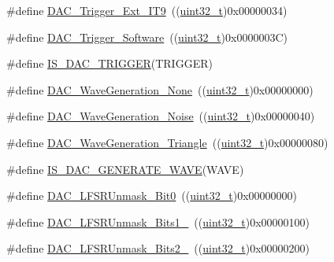 \begin{DoxyCompactItemize}
\item 
\#define \hyperlink{group___d_a_c__trigger__selection_ga67c15b2c26246a2304f9db28e25adcc4}{D\+A\+C\+\_\+\+Trigger\+\_\+\+Ext\+\_\+\+I\+T9}~((\hyperlink{_p_e___types_8h_a33594304e786b158f3fb30289278f5af}{uint32\+\_\+t})0x00000034)
\item 
\#define \hyperlink{group___d_a_c__trigger__selection_gadef77bb8bbd109232900902402ef637f}{D\+A\+C\+\_\+\+Trigger\+\_\+\+Software}~((\hyperlink{_p_e___types_8h_a33594304e786b158f3fb30289278f5af}{uint32\+\_\+t})0x0000003\+C)
\item 
\#define \hyperlink{group___d_a_c__trigger__selection_ga4409b79639e6ae3b1f0ed61a33c810a3}{I\+S\+\_\+\+D\+A\+C\+\_\+\+T\+R\+I\+G\+G\+ER}(T\+R\+I\+G\+G\+ER)
\item 
\#define \hyperlink{group___d_a_c__wave__generation_gaabbcd575d6106267f6b65ce988158f29}{D\+A\+C\+\_\+\+Wave\+Generation\+\_\+\+None}~((\hyperlink{_p_e___types_8h_a33594304e786b158f3fb30289278f5af}{uint32\+\_\+t})0x00000000)
\item 
\#define \hyperlink{group___d_a_c__wave__generation_ga1692990325098cae6f32182c1fa0f61e}{D\+A\+C\+\_\+\+Wave\+Generation\+\_\+\+Noise}~((\hyperlink{_p_e___types_8h_a33594304e786b158f3fb30289278f5af}{uint32\+\_\+t})0x00000040)
\item 
\#define \hyperlink{group___d_a_c__wave__generation_ga68f1a71011437a5ea6298ab039554714}{D\+A\+C\+\_\+\+Wave\+Generation\+\_\+\+Triangle}~((\hyperlink{_p_e___types_8h_a33594304e786b158f3fb30289278f5af}{uint32\+\_\+t})0x00000080)
\item 
\#define \hyperlink{group___d_a_c__wave__generation_ga50fb2dd12305cd7bd0b738a1f6388d3c}{I\+S\+\_\+\+D\+A\+C\+\_\+\+G\+E\+N\+E\+R\+A\+T\+E\+\_\+\+W\+A\+VE}(W\+A\+VE)
\item 
\#define \hyperlink{group___d_a_c__lfsrunmask__triangleamplitude_ga60794fd5092a332cfa82e1cee13945fc}{D\+A\+C\+\_\+\+L\+F\+S\+R\+Unmask\+\_\+\+Bit0}~((\hyperlink{_p_e___types_8h_a33594304e786b158f3fb30289278f5af}{uint32\+\_\+t})0x00000000)
\item 
\#define \hyperlink{group___d_a_c__lfsrunmask__triangleamplitude_ga09f47cfa563252a1add4662284350c07}{D\+A\+C\+\_\+\+L\+F\+S\+R\+Unmask\+\_\+\+Bits1\+\_}~((\hyperlink{_p_e___types_8h_a33594304e786b158f3fb30289278f5af}{uint32\+\_\+t})0x00000100)
\item 
\#define \hyperlink{group___d_a_c__lfsrunmask__triangleamplitude_ga60b800857b7e33d9c0be2846fc56849f}{D\+A\+C\+\_\+\+L\+F\+S\+R\+Unmask\+\_\+\+Bits2\+\_}~((\hyperlink{_p_e___types_8h_a33594304e786b158f3fb30289278f5af}{uint32\+\_\+t})0x00000200)

\end{DoxyCompactItemize}
